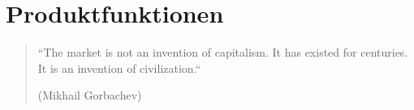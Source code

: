 \chapter{Produktfunktionen} \label{chapter:thevetestcase}

\begin{quotation}
``The market is not an invention of capitalism. It has existed for centuries. It is an invention of civilization.``
\begin{flushright}
(Mikhail Gorbachev)
\end{flushright}
\end{quotation}
